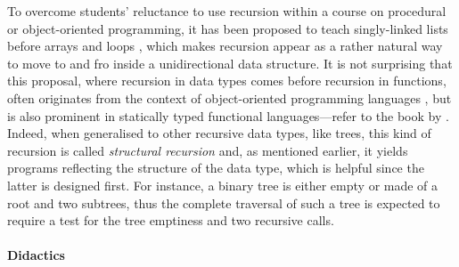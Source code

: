 \documentclass[11pt,a4paper]{article}
\begin{document}
To overcome students' reluctance to use recursion within a course on
procedural or object\hyp{}oriented programming, it has been proposed
to teach singly\hyp{}linked lists before arrays and loops
\citep{TurbakRoydenStephanHerbst:1999,BruceDanylukMurtagh:2005,GoldwasserLetscher:2007},
which makes recursion appear as a rather natural way to move to and
fro inside a unidirectional data structure. It is not surprising that
this proposal, where recursion in data types comes before recursion in
functions, often originates from the context of object\hyp{}oriented
programming languages
\citep{FelleisenFriedman:1997,Levine:2000,Bloch:2003,Sher:2004}, but
is also prominent in statically typed functional languages---refer to
the book by
\textcite{FelleisenFindlerFlattKrishnamurthi:2001}. Indeed, when
generalised to other recursive data types, like trees, this kind of
recursion is called \emph{structural recursion} and, as mentioned
earlier, it yields programs reflecting the structure of the data type,
which is helpful since the latter is designed first. For instance, a
binary tree is either empty or made of a root and two subtrees, thus
the complete traversal of such a tree is expected to require a test
for the tree emptiness and two recursive calls.

\paragraph{Didactics}
\label{didactics}
\end{document}
